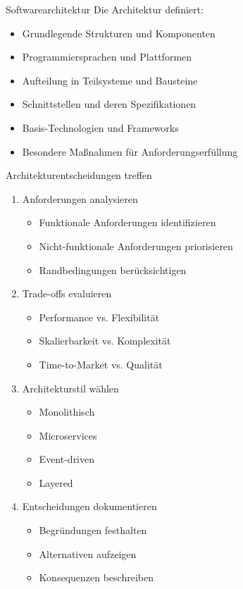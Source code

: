 \begin{definition}{Softwarearchitektur}
Die Architektur definiert:
\begin{itemize}
    \item Grundlegende Strukturen und Komponenten
    \item Programmiersprachen und Plattformen
    \item Aufteilung in Teilsysteme und Bausteine
    \item Schnittstellen und deren Spezifikationen
    \item Basis-Technologien und Frameworks
    \item Besondere Maßnahmen für Anforderungserfüllung
\end{itemize}
\end{definition}

\begin{KR}{Architekturentscheidungen treffen}
\begin{enumerate}
    \item Anforderungen analysieren
    \begin{itemize}
        \item Funktionale Anforderungen identifizieren
        \item Nicht-funktionale Anforderungen priorisieren
        \item Randbedingungen berücksichtigen
    \end{itemize}
    
    \item Trade-offs evaluieren
    \begin{itemize}
        \item Performance vs. Flexibilität
        \item Skalierbarkeit vs. Komplexität
        \item Time-to-Market vs. Qualität
    \end{itemize}
    
    \item Architekturstil wählen
    \begin{itemize}
        \item Monolithisch
        \item Microservices
        \item Event-driven
        \item Layered
    \end{itemize}
    
    \item Entscheidungen dokumentieren
    \begin{itemize}
        \item Begründungen festhalten
        \item Alternativen aufzeigen
        \item Konsequenzen beschreiben
    \end{itemize}
\end{enumerate}
\end{KR}

